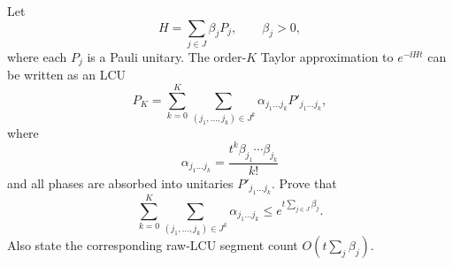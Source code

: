Let
$$
    H=\sum_{j\in J}\beta_jP_j,
    \qquad
    \beta_j>0,
$$
where each $P_j$ is a Pauli unitary.  The order-$K$ Taylor approximation to $e^{-\ii Ht}$ can be written as an LCU
$$
    P_K=\sum_{k=0}^K\sum_{(j_1,\dots,j_k)\in J^k}
    \alpha_{j_1\dots j_k}P'_{j_1\dots j_k},
$$
where
$$
    \alpha_{j_1\dots j_k}=\frac{t^k\beta_{j_1}\cdots\beta_{j_k}}{k!}
$$
and all phases are absorbed into unitaries $P'_{j_1\dots j_k}$.  Prove that
$$
    \sum_{k=0}^K\sum_{(j_1,\dots,j_k)\in J^k}\alpha_{j_1\dots j_k}
    \leq e^{t\sum_{j\in J}\beta_j}.
$$
Also state the corresponding raw-LCU segment count $O(t\sum_j\beta_j)$.
